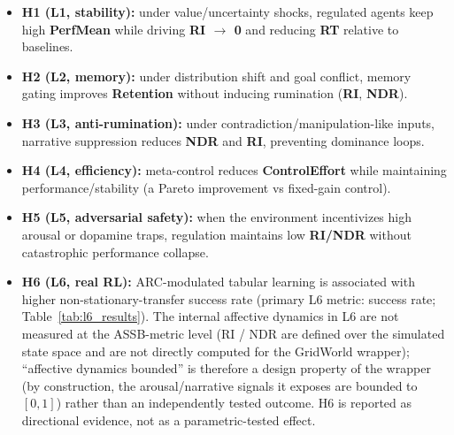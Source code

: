 \documentclass{article}
\begin{document}
\begin{itemize}
    \item \textbf{H1 (L1, stability):} under value/uncertainty shocks, regulated agents keep high \textbf{PerfMean} while driving \textbf{RI $\to$ 0} and reducing \textbf{RT} relative to baselines.
    \item \textbf{H2 (L2, memory):} under distribution shift and goal conflict, memory gating improves \textbf{Retention} without inducing rumination (\textbf{RI}, \textbf{NDR}).
    \item \textbf{H3 (L3, anti-rumination):} under contradiction/manipulation-like inputs, narrative suppression reduces \textbf{NDR} and \textbf{RI}, preventing dominance loops.
    \item \textbf{H4 (L4, efficiency):} meta-control reduces \textbf{ControlEffort} while maintaining performance/stability (a Pareto improvement vs fixed-gain control).
    \item \textbf{H5 (L5, adversarial safety):} when the environment incentivizes high arousal or dopamine traps, regulation maintains low \textbf{RI/NDR} without catastrophic performance collapse.
    \item \textbf{H6 (L6, real RL):} ARC-modulated tabular learning is associated with higher non-stationary-transfer success rate (primary L6 metric: success rate; Table~\ref{tab:l6_results}). The internal affective dynamics in L6 are not measured at the ASSB-metric level (RI / NDR are defined over the simulated state space and are not directly computed for the GridWorld wrapper); ``affective dynamics bounded'' is therefore a design property of the wrapper (by construction, the arousal/narrative signals it exposes are bounded to $[0,1]$) rather than an independently tested outcome. H6 is reported as directional evidence, not as a parametric-tested effect.
\end{itemize}
\end{document}
